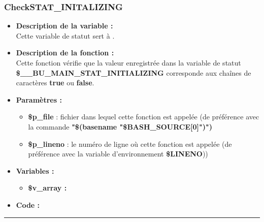 \documentclass[a4paper,10pt]{article}
\begin{document}
\subsubsection{CheckSTAT\_INITALIZING}\color{white}
\begin{itemize}
    \item \textbf{Description de la variable :}\\
    Cette variable de statut sert à .\\[1\baselineskip]

    \item \textbf{Description de la fonction :}\\
        Cette fonction vérifie que la valeur enregistrée dans la variable de statut \textbf{\color{orange}\$\_\_BU\_MAIN\_STAT\_INITIALIZING} corresponde aux chaînes de caractères \textbf{true} ou \textbf{false}.\\[1\baselineskip]

    \item \textbf{Paramètres :}
    \begin{itemize}
        \item \color{orange}\textbf{\$p\_file}\color{white} : fichier dans lequel cette fonction est appelée (de préférence avec la commande \textbf{"\$(\color{gray}basename \color{white}"\color{orange}\$BASH\_SOURCE[0]\color{white}")")}\\[1\baselineskip]

        \item \color{orange}\textbf{\$p\_lineno}\color{white} : le numéro de ligne où cette fonction est appelée (de préférence avec la variable d'environnement \textbf{\color{orange}\$LINENO}))\\[1\baselineskip]
    \end{itemize}

    \item \textbf{Variables :}
    \begin{itemize}
        \item \textbf{\color{orange}\$v\_array\color{white} :}\\[1\baselineskip]
    \end{itemize}


    \item \textbf{Code :}
\end{itemize}


\color{blue}\par\noindent\rule{\textwidth}{0.4pt}\color{white}

\color{blue}
\end{document}
